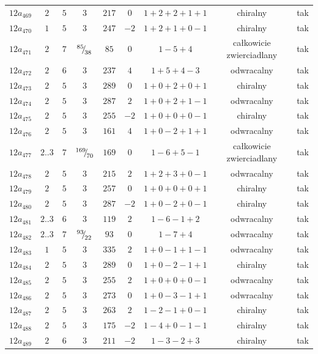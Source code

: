 \begin{longtable}{ccccccccc}
$12a_{469}$ & $2$ & $5$ & $3$ & $217$ & $0$ & $1+2+2+1+1$ & chiralny & tak \\
$12a_{470}$ & $1$ & $5$ & $3$ & $247$ & $-2$ & $1+2+1+0-1$ & chiralny & tak \\
$12a_{471}$ & $2$ & $7$ & ${}^{85}{\mskip -5mu/\mskip -3mu}_{38}$ & $85$ & $0$ & $1-5+4$ & całkowicie zwierciadlany & tak \\
$12a_{472}$ & $2$ & $6$ & $3$ & $237$ & $4$ & $1+5+4-3$ & odwracalny & tak \\
$12a_{473}$ & $2$ & $5$ & $3$ & $289$ & $0$ & $1+0+2+0+1$ & chiralny & tak \\
$12a_{474}$ & $2$ & $5$ & $3$ & $287$ & $2$ & $1+0+2+1-1$ & odwracalny & tak \\
$12a_{475}$ & $2$ & $5$ & $3$ & $255$ & $-2$ & $1+0+0+0-1$ & chiralny & tak \\
$12a_{476}$ & $2$ & $5$ & $3$ & $161$ & $4$ & $1+0-2+1+1$ & odwracalny & tak \\
$12a_{477}$ & $2..3$ & $7$ & ${}^{169}{\mskip -5mu/\mskip -3mu}_{70}$ & $169$ & $0$ & $1-6+5-1$ & całkowicie zwierciadlany & tak \\
$12a_{478}$ & $2$ & $5$ & $3$ & $215$ & $2$ & $1+2+3+0-1$ & odwracalny & tak \\
$12a_{479}$ & $2$ & $5$ & $3$ & $257$ & $0$ & $1+0+0+0+1$ & chiralny & tak \\
$12a_{480}$ & $2$ & $5$ & $3$ & $287$ & $-2$ & $1+0-2+0-1$ & chiralny & tak \\
$12a_{481}$ & $2..3$ & $6$ & $3$ & $119$ & $2$ & $1-6-1+2$ & odwracalny & tak \\
$12a_{482}$ & $2..3$ & $7$ & ${}^{93}{\mskip -5mu/\mskip -3mu}_{22}$ & $93$ & $0$ & $1-7+4$ & odwracalny & tak \\
$12a_{483}$ & $1$ & $5$ & $3$ & $335$ & $2$ & $1+0-1+1-1$ & odwracalny & tak \\
$12a_{484}$ & $2$ & $5$ & $3$ & $289$ & $0$ & $1+0-2-1+1$ & chiralny & tak \\
$12a_{485}$ & $2$ & $5$ & $3$ & $255$ & $2$ & $1+0+0+0-1$ & odwracalny & tak \\
$12a_{486}$ & $2$ & $5$ & $3$ & $273$ & $0$ & $1+0-3-1+1$ & odwracalny & tak \\
$12a_{487}$ & $2$ & $5$ & $3$ & $263$ & $2$ & $1-2-1+0-1$ & chiralny & tak \\
$12a_{488}$ & $2$ & $5$ & $3$ & $175$ & $-2$ & $1-4+0-1-1$ & chiralny & tak \\
$12a_{489}$ & $2$ & $6$ & $3$ & $211$ & $-2$ & $1-3-2+3$ & chiralny & tak \\

\end{longtable}
